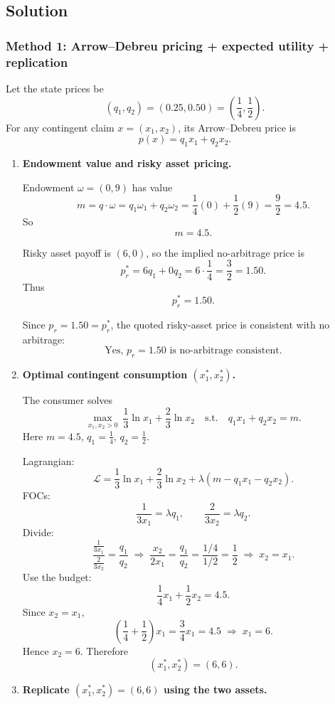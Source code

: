 \documentclass[12pt]{article}
\begin{document}
\newpage
\subsection*{Solution}

\subsubsection*{Method 1: Arrow--Debreu pricing + expected utility + replication}

Let the state prices be
\[
(q_1,q_2)=(0.25,0.50)=\left(\frac14,\frac12\right).
\]
For any contingent claim \(x=(x_1,x_2)\), its Arrow--Debreu price is
\[
p(x)=q_1x_1+q_2x_2.
\]

\begin{enumerate}[label=(\alph*)]
\item \textbf{Endowment value and risky asset pricing.}

Endowment \(\omega=(0,9)\) has value
\[
m=q\cdot \omega = q_1\omega_1+q_2\omega_2
=\frac14(0)+\frac12(9)=\frac92=4.5.
\]
So
\[
\boxed{m=4.5.}
\]

Risky asset payoff is \((6,0)\), so the implied no-arbitrage price is
\[
p_r^*=6q_1+0q_2=6\cdot \frac14=\frac32=1.50.
\]
Thus
\[
\boxed{p_r^*=1.50.}
\]

Since \(p_r=1.50=p_r^*\), the quoted risky-asset price is consistent with no arbitrage:
\[
\boxed{\text{Yes, }p_r=1.50\text{ is no-arbitrage consistent.}}
\]

\item \textbf{Optimal contingent consumption \((x_1^*,x_2^*)\).}

The consumer solves
\[
\max_{x_1,x_2>0}\ \frac13\ln x_1+\frac23\ln x_2
\quad \text{s.t.}\quad
q_1x_1+q_2x_2=m.
\]
Here \(m=4.5\), \(q_1=\frac14\), \(q_2=\frac12\).

Lagrangian:
\[
\mathcal L=\frac13\ln x_1+\frac23\ln x_2+\lambda(m-q_1x_1-q_2x_2).
\]
FOCs:
\[
\frac{1}{3x_1}=\lambda q_1,\qquad \frac{2}{3x_2}=\lambda q_2.
\]
Divide:
\[
\frac{\frac{1}{3x_1}}{\frac{2}{3x_2}}=\frac{q_1}{q_2}
\;\Longrightarrow\;
\frac{x_2}{2x_1}=\frac{q_1}{q_2}
=\frac{1/4}{1/2}=\frac12
\;\Longrightarrow\;
x_2=x_1.
\]
Use the budget:
\[
\frac14 x_1+\frac12 x_2=4.5.
\]
Since \(x_2=x_1\),
\[
\left(\frac14+\frac12\right)x_1=\frac34x_1=4.5
\;\Longrightarrow\;
x_1=6.
\]
Hence \(x_2=6\). Therefore
\[
\boxed{(x_1^*,x_2^*)=(6,6).}
\]

\item \textbf{Replicate \((x_1^*,x_2^*)=(6,6)\) using the two assets.}


\end{enumerate}
\end{document}
